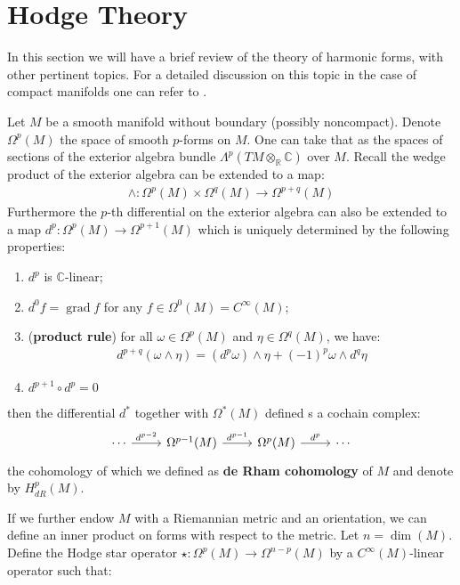 \documentclass[11pt]{report}
\theoremstyle{definition}
\theoremstyle{plain}
\DeclareMathOperator{\grad}{grad}
\newcommand{\real}{\mathbb{R}}
\newcommand{\complex}{\mathbb{C}}
\begin{document}
\section{Hodge Theory}
\par In this section we will have a brief review of the theory of harmonic forms, with other pertinent topics. For a detailed discussion on this topic in the case of compact manifolds one can refer to \cite[Chapter~4]{morita2001}.
\par Let $M$ be a smooth manifold without boundary (possibly noncompact). Denote $\Omega^p(M)$ the space of smooth $p$-forms on $M$. One can take that as the spaces of sections of the exterior algebra bundle $\Lambda^p(TM\otimes_\real \complex)$ over $M$. Recall the wedge product of the exterior algebra can be extended to a map: 
\begin{align}
\wedge: \Omega^p(M) \times \Omega^q(M)\to \Omega^{p+q}(M)
\end{align}
Furthermore the $p$-th differential on the exterior algebra can also be extended to a map $d^p:\Omega^p(M)\to \Omega^{p+1}(M)$ which is uniquely determined by the following properties:
\begin{enumerate}
	\item $d^p$ is $\complex$-linear;
	\item $d^0f=\grad f$ for any $f\in \Omega^0(M)=C^\infty(M)$;
	\item (\textbf{product rule}) for all $\omega\in \Omega^p(M)$ and $\eta\in \Omega^q(M)$, we have:
	\begin{align*}
	d^{p+q}(\omega\wedge \eta)=(d^p\omega)\wedge \eta+(-1)^p\omega \wedge d^q\eta
	\end{align*}
	\item $d^{p+1}\circ d^p=0$
\end{enumerate}
then the differential $d^*$ together with $\Omega^*(M)$ defined s a cochain complex:
\begin{equation*}
\begin{tikzcd}
\cdots\rar{d^{p-2}} & \Omega^{p-1}(M) \rar{d^{p-1}} &\Omega^p(M) \rar{d^p}&\cdots
\end{tikzcd}
\end{equation*}
the cohomology of which we defined as \textbf{de Rham cohomology} of $M$ and denote by $H^p_{dR}(M)$.
\par If we further endow $M$ with a Riemannian metric and an orientation, we can define an inner product on forms with respect to the metric. Let $n=\dim(M)$. Define the Hodge star operator $\star:\Omega^p(M)\to \Omega^{n-p}(M)$ by a $C^\infty(M)$-linear operator such that:
\end{document}
